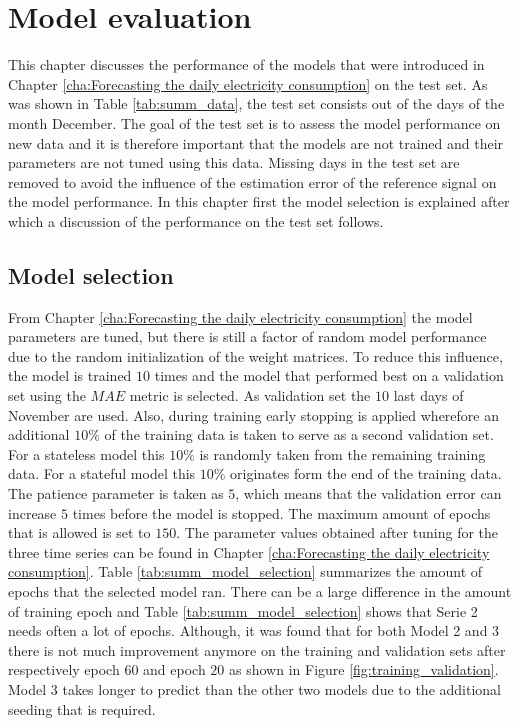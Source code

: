 \chapter{Model evaluation}
\label{cha:Model evaluation}

This chapter discusses the performance of the models that were introduced in Chapter \ref{cha:Forecasting the daily electricity consumption} on the test set. As was shown in Table \ref{tab:summ_data}, the test set consists out of the days of the month December. The goal of the test set is to assess the model performance on new data and it is therefore important that the models are not trained and their parameters are not tuned using this data. Missing days in the test set are removed to avoid the influence of the estimation error of the reference signal on the model performance. In this chapter first the model selection is explained after which a discussion of the performance on the test set follows.

\section{Model selection}\label{s:Model selection}
From Chapter \ref{cha:Forecasting the daily electricity consumption} the model parameters are tuned, but there is still a factor of random model performance due to the random initialization of the weight matrices. To reduce this influence, the model is trained $ 10 $ times and the model that performed best on a validation set using the $ MAE $ metric is selected. As validation set the $ 10 $ last days of November are used. Also, during training early stopping is applied wherefore an additional $ 10\% $ of the training data is taken to serve as a second validation set. For a stateless model this $ 10\% $ is randomly taken from the remaining training data. For a stateful model this $ 10\% $ originates form the end of the training data. The patience parameter is taken as $ 5 $, which means that the validation error can increase $ 5 $ times before the model is stopped. The maximum amount of epochs that is allowed is set to $ 150 $. The parameter values obtained after tuning for the three time series can be found in Chapter \ref{cha:Forecasting the daily electricity consumption}. Table \ref{tab:summ_model_selection} summarizes the amount of epochs that the selected model ran. There can be a large difference in the amount of training epoch and Table \ref{tab:summ_model_selection} shows that Serie 2 needs often a lot of epochs. Although, it was found that for both Model 2 and 3 there is not much improvement anymore on the training and validation sets after respectively epoch $ 60 $ and epoch $ 20 $ as shown in Figure \ref{fig:training_validation}. Model 3 takes longer to predict than the other two models due to the additional seeding that is required.

